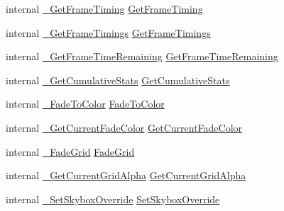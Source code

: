 \begin{DoxyCompactItemize}
\item 
internal \mbox{\hyperlink{struct_valve_1_1_v_r_1_1_i_v_r_compositor_a6346b53c57bb41157b6fa9946537b334}{\+\_\+\+Get\+Frame\+Timing}} \mbox{\hyperlink{struct_valve_1_1_v_r_1_1_i_v_r_compositor_ad2cdd4bf978eeda19961df5c88e424ce}{Get\+Frame\+Timing}}
\item 
internal \mbox{\hyperlink{struct_valve_1_1_v_r_1_1_i_v_r_compositor_a136355380a2308c5dc9f690b1ca77c60}{\+\_\+\+Get\+Frame\+Timings}} \mbox{\hyperlink{struct_valve_1_1_v_r_1_1_i_v_r_compositor_acbcbbcee7076791f10d650af68a95328}{Get\+Frame\+Timings}}
\item 
internal \mbox{\hyperlink{struct_valve_1_1_v_r_1_1_i_v_r_compositor_a946f8645a1cf6d6380064532df33d6d0}{\+\_\+\+Get\+Frame\+Time\+Remaining}} \mbox{\hyperlink{struct_valve_1_1_v_r_1_1_i_v_r_compositor_a16e7269af018b0589ede9e3d7d618487}{Get\+Frame\+Time\+Remaining}}
\item 
internal \mbox{\hyperlink{struct_valve_1_1_v_r_1_1_i_v_r_compositor_a5b17db2366df6ea7d74ca5b03c9037d4}{\+\_\+\+Get\+Cumulative\+Stats}} \mbox{\hyperlink{struct_valve_1_1_v_r_1_1_i_v_r_compositor_aa3cf0b9048bdc0ee3e1c0a9a431bebe1}{Get\+Cumulative\+Stats}}
\item 
internal \mbox{\hyperlink{struct_valve_1_1_v_r_1_1_i_v_r_compositor_ab967ee4e10a9344a4790c20786ed21c6}{\+\_\+\+Fade\+To\+Color}} \mbox{\hyperlink{struct_valve_1_1_v_r_1_1_i_v_r_compositor_a09cc2ac11d93021e5f9e6530fab0757b}{Fade\+To\+Color}}
\item 
internal \mbox{\hyperlink{struct_valve_1_1_v_r_1_1_i_v_r_compositor_ae7afb03647118e23520b2b59de4c5ec4}{\+\_\+\+Get\+Current\+Fade\+Color}} \mbox{\hyperlink{struct_valve_1_1_v_r_1_1_i_v_r_compositor_a628fbabf5a244406d5112eced13c63dc}{Get\+Current\+Fade\+Color}}
\item 
internal \mbox{\hyperlink{struct_valve_1_1_v_r_1_1_i_v_r_compositor_a24abe64d80aceed84bdeabb788a8b683}{\+\_\+\+Fade\+Grid}} \mbox{\hyperlink{struct_valve_1_1_v_r_1_1_i_v_r_compositor_a8db3c38a395e7352920379547c8071a0}{Fade\+Grid}}
\item 
internal \mbox{\hyperlink{struct_valve_1_1_v_r_1_1_i_v_r_compositor_af32ee4004d4955894735f00e6d4dfbe3}{\+\_\+\+Get\+Current\+Grid\+Alpha}} \mbox{\hyperlink{struct_valve_1_1_v_r_1_1_i_v_r_compositor_a391e74f059c4716270e2e8d168662850}{Get\+Current\+Grid\+Alpha}}
\item 
internal \mbox{\hyperlink{struct_valve_1_1_v_r_1_1_i_v_r_compositor_a6d4862a15d14c6786ea787b59a6d08c1}{\+\_\+\+Set\+Skybox\+Override}} \mbox{\hyperlink{struct_valve_1_1_v_r_1_1_i_v_r_compositor_a484354e0ace511b6b47aa7a25157882a}{Set\+Skybox\+Override}}

\end{DoxyCompactItemize}
